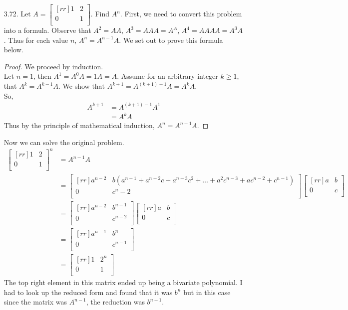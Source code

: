 \documentclass[12pt]{article}
\begin{document}
\begin{enumerate}
\pagebreak
\item [3.72.] Let $A= \begin{bmatrix}[rr] 1 & 2\\ 0 & 1\\ \end{bmatrix}$. Find $A^n$.
	First, we need to convert this problem into a formula. Observe that $A^2=AA$, $A^3=AAA=A^A$, $A^4=AAAA=A^3A$. Thus for each value $n$, $A^n=A^{n-1}A$. We set out to prove this formula below.
	\begin{proof}
	We proceed by induction.\\
	Let $n=1$, then $A^1 = A^0A = 1A = A$. Assume for an arbitrary integer $k \geq 1$, that $A^k=A^{k-1}A$. We show that $A^{k+1} = A^{(k+1)-1}A = A^kA$.\\
	So,
		\begin{align*}
		A^{k+1} &= A^{(k+1)-1}A^1\\
		&= A^kA
		\end{align*}
	Thus by the principle of mathematical induction, $A^n = A^{n-1}A$.
	\end{proof}
	Now we can solve the original problem.
	\begin{align*}
	\begin{bmatrix}[rr] 1& 2\\ 0 & 1\\ \end{bmatrix}^n
	&= 
	A^{n-1}A \\
	&= 
	\begin{bmatrix}[rr]
	a^{n-2} & b(a^{n-1}+a^{n-2}c+a^{n-3}c^2+ \dots + a^2c^{n-3}+ac^{n-2}+c^{n-1})\\
	0 & c^n-2\\
	\end{bmatrix}
	\begin{bmatrix}[rr]
	a & b\\
	0 & c\\
	\end{bmatrix}\\
	&=
	\begin{bmatrix}[rr]
	a^{n-2} & b^{n-1}\\
	0 & c^{n-2}\\
	\end{bmatrix}
	\begin{bmatrix}[rr]
	a & b\\ 
	0 & c\\
	\end{bmatrix}\\
	&=
	\begin{bmatrix}[rr]
	a^{n-1} & b^n\\
	0 & c^{n-1}\\
	\end{bmatrix}\\
	&=
	\begin{bmatrix}[rr]
	1 & 2^n\\
	0 & 1\\
	\end{bmatrix}
	\end{align*}
	The top right element in this matrix ended up being a bivariate polynomial. I had to look up the reduced form and found that it was $b^n$ but in this case since the matrix was $A^{n-1}$, the reduction was $b^{n-1}$.


\end{enumerate}
\end{document}
